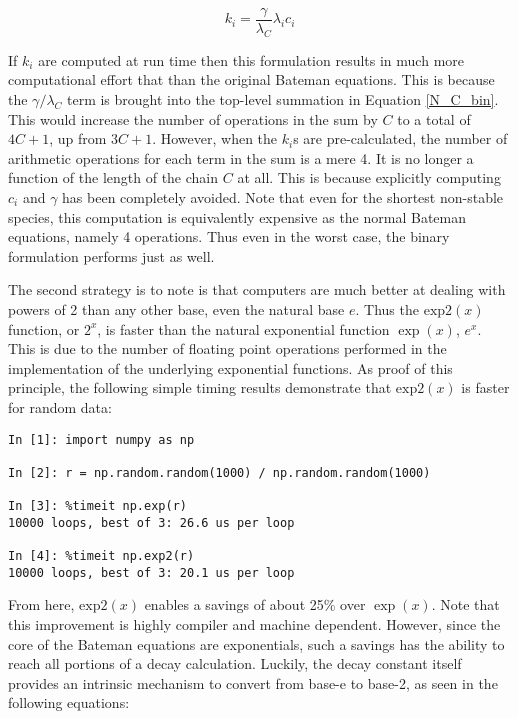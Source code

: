 \documentclass{anstrans}
\begin{document}
\begin{equation}
\label{k_i}
k_i = \frac{\gamma}{\lambda_C} \lambda_i c_i
\end{equation}

If $k_i$ are computed at run time then this formulation results in much 
more computational effort that than the original Bateman equations. This is 
because the $\gamma/\lambda_C$ term is brought into the top-level summation 
in Equation \ref{N_C_bin}. This would increase the number of operations in the 
sum by $C$ to a total of $4C+1$, up from $3C+1$.
However, when the $k_i$s  are pre-calculated, 
the number of arithmetic operations for each term in the sum is a mere 4.
It is no longer a function of the length of the chain $C$ at all.  This is 
because explicitly computing $c_i$ and $\gamma$ has been completely avoided.
Note that even for the shortest non-stable species, this computation is 
equivalently expensive as the normal Bateman equations, namely 4 operations.
Thus even in the worst case, the binary formulation performs just as well.

The second strategy is to note is that computers are much better at dealing 
with powers of 2 than any other base, even the natural base $e$. Thus the 
$\mathrm{exp2}(x)$ function, or $2^x$, is faster than the natural exponential 
function $\exp(x)$, $e^x$.  This is due to the number of floating point
operations performed in the implementation of the underlying exponential 
functions. As proof of this principle, the following simple timing results
demonstrate that $\mathrm{exp2}(x)$ is faster for random data:

\begin{lstlisting}[caption={Exponential Timing Comparison}, 
                   label=expcmp]
In [1]: import numpy as np

In [2]: r = np.random.random(1000) / np.random.random(1000)

In [3]: %timeit np.exp(r)
10000 loops, best of 3: 26.6 us per loop

In [4]: %timeit np.exp2(r)
10000 loops, best of 3: 20.1 us per loop
\end{lstlisting}

From here, $\mathrm{exp2}(x)$ enables a savings of about 25\% over 
$\exp(x)$. Note that this improvement is highly compiler and machine dependent.
However, since the core of the Bateman equations are exponentials, 
such a savings has the ability to reach all portions of a decay calculation.
Luckily, the decay constant itself provides an intrinsic mechanism to convert 
from base-e to base-2, as seen in the following equations:
\end{document}
